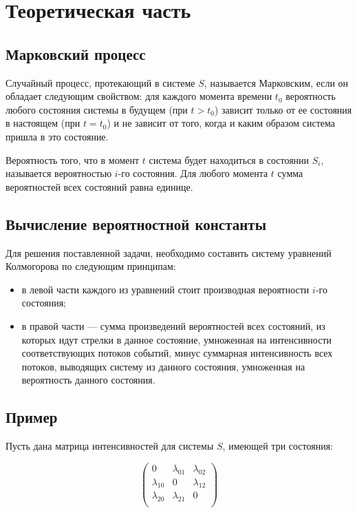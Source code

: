 \chapter{Теоретическая часть}

\section{Марковский процесс}

Случайный процесс, протекающий в системе $S$, называется Марковским, если он обладает следующим свойством: для каждого момента времени $t_0$ вероятность любого состояния системы в будущем (при $t > t_0$) зависит только от ее состояния в настоящем (при $t = t_0$) и не зависит от того, когда и каким образом система пришла в это состояние. 

Вероятность того, что в момент $t$ система будет находиться в состоянии $S_i$, называется 
вероятностью $i$-го состояния. Для любого момента $t$ сумма вероятностей всех состояний равна единице.

\section{Вычисление вероятностной константы}

Для решения поставленной задачи, необходимо составить систему уравнений Колмогорова по следующим принципам: 
\begin{itemize}
    \item в левой части каждого из уравнений стоит производная вероятности $i$-го состояния;
    \item в правой части --- сумма произведений вероятностей всех состояний, из которых идут стрелки в данное состояние, умноженная на интенсивности соответствующих потоков событий, минус суммарная интенсивность всех потоков, выводящих систему из данного состояния, умноженная на вероятность данного состояния.
\end{itemize}

\section{Пример}

Пусть дана матрица интенсивностей для системы $S$, имеющей три состояния:

\begin{equation}
  \left( {\begin{array}{ccc}
    0 & \lambda_{01} & \lambda_{02} \\
    \lambda_{10} & 0 &\lambda_{12} \\
    \lambda_{20} & \lambda_{21} & 0\\
  \end{array} } \right)
\end{equation}

